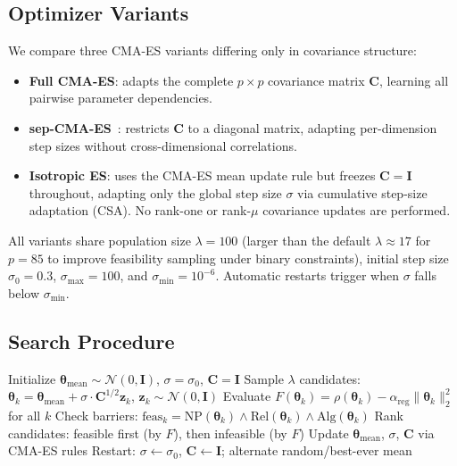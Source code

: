 \documentclass[twoside]{article}
\newcommand{\btheta}{\boldsymbol{\theta}}
\newcommand{\bC}{\mathbf{C}}
\newcommand{\bI}{\mathbf{I}}
\begin{document}
\subsection{Optimizer Variants}

We compare three CMA-ES variants differing only in covariance structure:

\begin{itemize}
\item \textbf{Full CMA-ES}: adapts the complete $p \times p$ covariance matrix
  $\bC$, learning all pairwise parameter dependencies.
\item \textbf{sep-CMA-ES}~\citep{ros2008simple}: restricts $\bC$ to a diagonal
  matrix, adapting per-dimension step sizes without cross-dimensional correlations.
\item \textbf{Isotropic ES}: uses the CMA-ES mean update rule but freezes
  $\bC = \bI$ throughout, adapting only the global step size $\sigma$ via
  cumulative step-size adaptation (CSA). No rank-one or rank-$\mu$ covariance
  updates are performed.
\end{itemize}

All variants share population size $\lambda = 100$ (larger than the default
$\lambda \approx 17$ for $p = 85$ to improve feasibility sampling under binary
constraints), initial step size $\sigma_0 = 0.3$, $\sigma_{\max} = 100$, and
$\sigma_{\min} = 10^{-6}$. Automatic restarts trigger when $\sigma$ falls below
$\sigma_{\min}$.

\subsection{Search Procedure}

\begin{algorithm}[t]
\caption{Barrier-constrained CMA-ES search}
\label{alg:search}
\begin{algorithmic}[1]
\STATE Initialize $\btheta_{\text{mean}} \sim \mathcal{N}(0, \bI)$, $\sigma = \sigma_0$, $\bC = \bI$
  \STATE Sample $\lambda$ candidates: $\btheta_k = \btheta_{\text{mean}} + \sigma \cdot \bC^{1/2} \mathbf{z}_k$, $\mathbf{z}_k \sim \mathcal{N}(0, \bI)$
  \STATE Evaluate $F(\btheta_k) = \rho(\btheta_k) - \alpha_{\text{reg}}\|\btheta_k\|_2^2$ for all $k$
  \STATE Check barriers: $\text{feas}_k = \text{NP}(\btheta_k) \wedge \text{Rel}(\btheta_k) \wedge \text{Alg}(\btheta_k)$
  \STATE Rank candidates: feasible first (by $F$), then infeasible (by $F$)
  \STATE Update $\btheta_{\text{mean}}$, $\sigma$, $\bC$ via CMA-ES rules
  \IF{$\sigma < \sigma_{\min}$}
    \STATE Restart: $\sigma \gets \sigma_0$, $\bC \gets \bI$; alternate random/best-ever mean
  \ENDIF
\ENDFOR
\end{algorithmic}
\end{algorithm}
\end{document}
